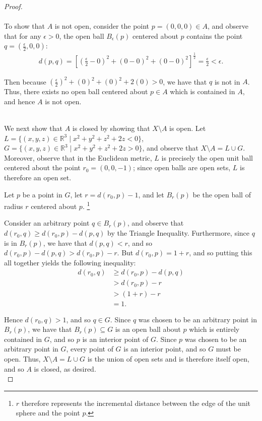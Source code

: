 \begin{proof}\ \\\\
    To show that $A$ is not open, consider the point $p = (0, 0, 0) \in A$, and observe that for any $\epsilon > 0$, the 
    open ball $B_\epsilon(p)$ centered about $p$ contains the point $q = \left( \frac{\epsilon}{2}, 0, 0 \right)$:
    \begin{align*}
        d(p, q) = \left[ \left(\frac{\epsilon}{2} - 0 \right)^2 + (0 - 0)^2 + (0 - 0)^2 \right]^\frac{1}{2}
                = \frac{\epsilon}{2}
                < \epsilon.
    \end{align*}
    
    Then because $(\frac{\epsilon}{2})^2 + (0)^2 + (0)^2 + 2(0) > 0$, we have that $q$ is not in $A$. Thus, there exists
    no open ball centered about $p \in A$ which is contained in $A$, and hence $A$ is not open.

    \ \\
    We next show that $A$ is closed by showing that $X \setminus A$ is open. Let  \linebreak
    $L = \{(x, y, z) \in \mathbb{R}^3 \mid x^2 + y^2 + z^2 + 2z < 0 \}$,
    $G = \{(x, y, z) \in \mathbb{R}^3 \mid x^2 + y^2 + z^2 + 2z > 0 \}$, and observe that $X \setminus A = L \cup G$.
    Moreover, observe that in the Euclidean metric, $L$ is precisely the open unit ball centered about the point 
    $r_0 = (0, 0, -1)$; since open balls are open sets, $L$ is therefore an open set.

    Let $p$ be a point in $G$, let $r = d(r_0, p) - 1$, and let $B_r(p)$ be the open ball of radius $r$ centered about
    $p$. \footnote{
        $r$ therefore represents the incremental distance between the edge of the unit sphere and the point $p$.
    }

    Consider an arbitrary point $q \in B_r(p)$, and observe that $d(r_0, q) \ge d(r_0, p) - d(p, q)$ by the Triangle
    Inequality. Furthermore, since $q$ is in $B_r(p)$, we have that $d(p, q) < r$, and so 
    $d(r_0, p) - d(p, q) > d(r_0, p) - r$. But $d(r_0, p) = 1 + r$, and so putting this all together yields the 
    following inequality:
    \begin{align*}
        d(r_0, q) &\ge d(r_0, p) - d(p, q) \\
                  &> d(r_0, p) - r \\
                  &> (1 + r) - r \\
                  &= 1.
    \end{align*}

    Hence $d(r_0, q) > 1$, and so $q \in G$. Since $q$ was chosen to be an arbitrary point in $B_r(p)$, we have that 
    $B_r(p) \subseteq G$ is an open ball about $p$ which is entirely contained in $G$, and so $p$ is an interior point
    of $G$. Since $p$ was chosen to be an arbitrary point in $G$, every point of $G$ is an interior point, and so $G$
    must be open. Thus, $X \setminus A = L \cup G$ is the union of open sets and is therefore itself open, and so $A$
    is closed, as desired.
    \ \\
\end{proof}

